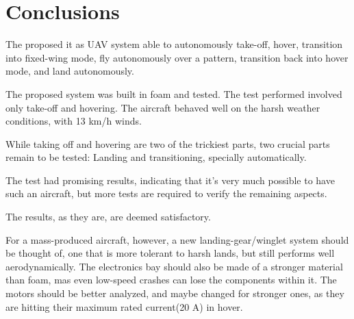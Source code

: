 \chapter{Conclusions} \label{chap:conclusions}

The proposed it as UAV system able to autonomously take-off, hover, transition into fixed-wing mode, fly autonomously over a pattern, transition back into hover mode, and land autonomously.

The proposed system was built in foam and tested.
The test performed involved only take-off and hovering. The aircraft behaved well on the harsh weather conditions, with 13 km/h winds.

While taking off and hovering are two of the trickiest parts, two crucial parts remain to be tested: Landing and transitioning, specially automatically.

The test had promising results, indicating that it's very much possible to have such an aircraft, but more tests are required to verify the remaining aspects.

The results, as they are, are deemed satisfactory.

For a mass-produced aircraft, however, a new landing-gear/winglet system should be thought of, one that is more tolerant to harsh lands, but still performs well aerodynamically.
The electronics bay should also be made of a stronger material than foam, mas even low-speed crashes can lose the components within it.
The motors should be better analyzed, and maybe changed for stronger ones, as they are hitting their maximum rated current(20 A) in hover.